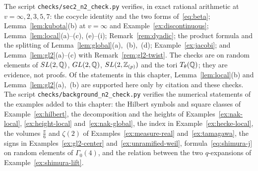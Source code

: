 \begin{remarkrev}\label{rem:verified}
The script \texttt{checks/sec2\_n2\_check.py} verifies, in exact rational
arithmetic at $v=\infty,2,3,5,7$: the cocycle identity and the two forms
of~\eqref{eq:beta}; Lemma~\ref{lem:kubota}(b) at $v=\infty$ and
Example~\ref{ex:discontinuous}; Lemma~\ref{lem:local}(a)--(c), (e)--(i);
Remark~\ref{rem:dyadic}; the product formula and the splitting of
Lemma~\ref{lem:global}(a),~(b),~(d); Example~\ref{ex:jacobi}; and
Lemma~\ref{lem:gl2}(a)--(c) with Remark~\ref{rem:gl2-twist}. The checks
are on random elements of $SL(2,\mathbb{Q})$, $GL(2,\mathbb{Q})$, $SL(2,\mathbb{Z}_{(p)})$ and
the tori $T_\theta(\mathbb{Q})$; they are evidence, not proofs. Of the
statements in this chapter, Lemma~\ref{lem:local}(b) and
Lemma~\ref{lem:gl2}(a),~(b) are supported here only by citation and these
checks. The script \texttt{checks/background\_n2\_check.py} verifies the
numerical statements of the examples added to this chapter: the Hilbert
symbols and square classes of Example~\ref{ex:hilbert}, the
decomposition and the heights of Examples~\ref{ex:nak-local},
\ref{ex:height-local} and~\ref{ex:nak-global}, the index in
Example~\ref{ex:hecke-local}, the volumes $\frac\pi6$ and $\zeta(2)$ of
Examples~\ref{ex:measure-real} and~\ref{ex:tamagawa}, the signs in
Examples~\ref{ex:gl2-center} and~\ref{ex:unramified-weil},
formula~\eqref{eq:shimura-j} on random elements of $\Gamma_0(4)$, and the
relation between the two $q$-expansions of Example~\ref{ex:shimura-lift}.
\end{remarkrev}
